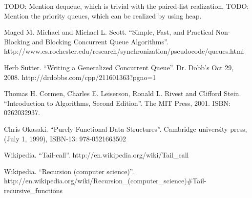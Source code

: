 \documentclass{article}
\begin{document}
TODO: Mention dequeue, which is trivial with the paired-list realization.
TODO: Mention the priority queues, which can be realized by using heap.


\begin{thebibliography}{99}

Maged M. Michael and Michael L. Scott. ``Simple, Fast, and Practical Non-Blocking and Blocking Concurrent Queue Algorithms''. http://www.cs.rochester.edu/research/synchronization/pseudocode/queues.html

Herb Sutter. ``Writing a Generalized Concurrent Queue''. Dr. Dobb's Oct 29, 2008. http://drdobbs.com/cpp/211601363?pgno=1

Thomas H. Cormen, Charles E. Leiserson, Ronald L. Rivest and Clifford Stein. ``Introduction to Algorithms, Second Edition''. The MIT Press, 2001. ISBN: 0262032937.

Chris Okasaki. ``Purely Functional Data Structures''. Cambridge university press, (July 1, 1999), ISBN-13: 978-0521663502

Wikipedia. ``Tail-call''. http://en.wikipedia.org/wiki/Tail\_call

Wikipedia. ``Recursion (computer science)''. http://en.wikipedia.org/wiki/Recursion\_(computer\_science)\#Tail-recursive\_functions

\end{thebibliography}

\ifx\wholebook\relax \else
\end{document}
